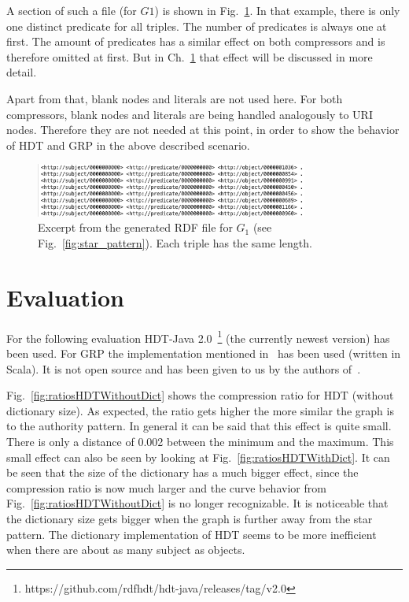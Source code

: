A section of such a file (for $G1$) is shown in Fig.~\ref{fig:rdfFile}. In that example, there is only one distinct predicate for all triples. The number of predicates is always one at first. The amount of predicates has a similar effect on both compressors and is therefore omitted at first. But in Ch.~\ref{sec:evalHDT} that effect will be discussed in more detail.

Apart from that, blank nodes and literals are not used here. For both compressors, blank nodes and literals are being handled analogously to URI nodes. Therefore they are not needed at this point, in order to show the behavior of HDT and GRP in the above described scenario.

\begin{figure}[h]
	\centering
	\includegraphics[width=0.8\textwidth]{figures/GRPvsHDT/file.png}
	\caption{Excerpt from the generated RDF file for $G_1$ (see Fig.~\ref{fig:star_pattern}). Each triple has the same length.}
	\label{fig:rdfFile}
\end{figure}

\section{Evaluation}\label{sec:evalHDT}

For the following evaluation HDT-Java 2.0~\footnote{\label{foot:1}https://github.com/rdfhdt/hdt-java/releases/tag/v2.0} (the currently newest version) has been used. For GRP the implementation mentioned in~\cite{maneth} has been used (written in Scala). It is not open source and has been given to us by the authors of~\cite{maneth}.

Fig.~\ref{fig:ratiosHDTWithoutDict} shows the compression ratio for HDT (without dictionary size). As expected, the ratio gets higher the more similar the graph is to the authority pattern. In general it can be said that this effect is quite small. There is only a distance of 0.002 between the minimum and the maximum. This small effect can also be seen by looking at Fig.~\ref{fig:ratiosHDTWithDict}. It can be seen that the size of the dictionary has a much bigger effect, since the compression ratio is now much larger and the curve behavior from Fig.~\ref{fig:ratiosHDTWithoutDict} is no longer recognizable. It is noticeable that the dictionary size gets bigger when the graph is further away from the star pattern. The dictionary implementation of HDT seems to be more inefficient when there are about as many subject as objects. 


